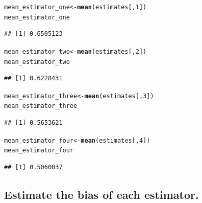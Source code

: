 \documentclass{article}\usepackage[]{graphicx}\usepackage[]{xcolor}
\makeatletter
\newcommand{\hlnum}[1]{\textcolor[rgb]{0.686,0.059,0.569}{#1}}%
\newcommand{\hlstd}[1]{\textcolor[rgb]{0.345,0.345,0.345}{#1}}%
\newcommand{\hlkwb}[1]{\textcolor[rgb]{0.69,0.353,0.396}{#1}}%
\newcommand{\hlkwd}[1]{\textcolor[rgb]{0.737,0.353,0.396}{\textbf{#1}}}%
\newenvironment{kframe}{%
 \def\at@end@of@kframe{}%
 \ifinner\ifhmode%
  \def\at@end@of@kframe{\end{minipage}}%
  \begin{minipage}{\columnwidth}%
 \fi\fi%
 \def\FrameCommand##1{\hskip\@totalleftmargin \hskip-\fboxsep
 \colorbox{shadecolor}{##1}\hskip-\fboxsep
     \hskip-\linewidth \hskip-\@totalleftmargin \hskip\columnwidth}%
 \MakeFramed {\advance\hsize-\width
   \@totalleftmargin\z@ \linewidth\hsize
   \@setminipage}}%
 {\par\unskip\endMakeFramed%
 \at@end@of@kframe}
\newenvironment{knitrout}{}{} %
\makeatother
\begin{document}
\begin{knitrout}
\color{fgcolor}\begin{kframe}
\begin{alltt}
\hlstd{mean_estimator_one} \hlkwb{<-} \hlkwd{mean}\hlstd{(estimates[,}\hlnum{1}\hlstd{])}
\hlstd{mean_estimator_one}
\end{alltt}
\begin{verbatim}
## [1] 0.6505123
\end{verbatim}
\begin{alltt}
\hlstd{mean_estimator_two} \hlkwb{<-} \hlkwd{mean}\hlstd{(estimates[,}\hlnum{2}\hlstd{])}
\hlstd{mean_estimator_two}
\end{alltt}
\begin{verbatim}
## [1] 0.6228431
\end{verbatim}
\begin{alltt}
\hlstd{mean_estimator_three} \hlkwb{<-} \hlkwd{mean}\hlstd{(estimates[,}\hlnum{3}\hlstd{])}
\hlstd{mean_estimator_three}
\end{alltt}
\begin{verbatim}
## [1] 0.5653621
\end{verbatim}
\begin{alltt}
\hlstd{mean_estimator_four} \hlkwb{<-} \hlkwd{mean}\hlstd{(estimates[,}\hlnum{4}\hlstd{])}
\hlstd{mean_estimator_four}
\end{alltt}
\begin{verbatim}
## [1] 0.5060037
\end{verbatim}
\end{kframe}
\end{knitrout}
  
  \subsection{Estimate the bias of each estimator.}
  
\end{document}
